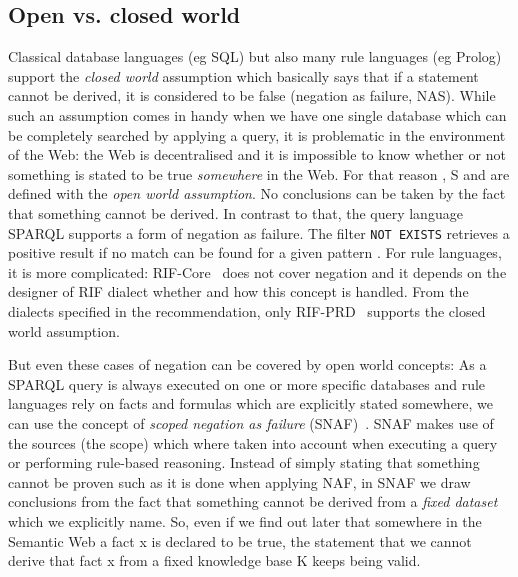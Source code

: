 \subsection{Open vs. closed world}
 Classical database languages (eg SQL)  but also many rule languages (eg Prolog) support the \emph{closed world} assumption which basically says that if a statement cannot 
be derived, 
it is considered to be false (negation as failure, NAS). While such an assumption comes in handy when we have one single database which can be completely searched by applying a query, 
it is problematic 
in the environment of the Web: the Web is decentralised and it is impossible to know whether or not something is stated to be true \emph{somewhere} in the Web.
For that reason \rdf, \rdf{}S and \owl are defined with the \emph{open world assumption}. No conclusions can be taken by the fact that something cannot be derived. 
In contrast to that, the query language SPARQL supports a form of negation as failure. The
filter \texttt{NOT EXISTS} retrieves a positive result if no match can be found for a given pattern \cite[Section 8]{sparql}.
For rule languages, it is more complicated:
RIF-Core~\cite{rifcore} does not cover negation and it depends on the designer of RIF dialect whether and how this concept is handled. From the dialects 
specified in the \wwwc recommendation, only RIF-PRD~\cite{rifprd} supports the closed world assumption. 

But even these cases of negation can be covered by open world concepts: As a SPARQL query is always executed on one or more specific databases and 
rule languages rely on facts and formulas which are explicitly stated somewhere, we  
can use the concept of \emph{scoped negation as failure} (SNAF)~\cite{rearch,snaf1,snaf2}. SNAF makes use of the sources (the scope) 
which where taken into account when executing a 
query or performing rule-based reasoning. Instead of simply stating that something cannot be proven such as it is done when applying NAF, in SNAF  we
draw conclusions from the fact that something cannot be derived from a \emph{fixed dataset} which we explicitly name. 
So, even if we find out later that somewhere in the Semantic Web a fact x is declared to be true, 
the statement that we cannot derive that fact x from a fixed knowledge base K 
keeps being valid.  


